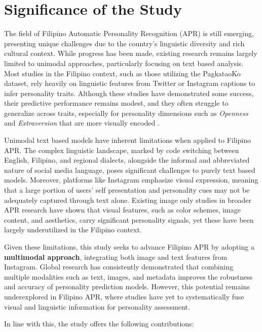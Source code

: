 
\section{Significance of the Study}
\label{sec: Significance}

The field of Filipino Automatic Personality Recognition (APR) is still emerging, presenting unique challenges due to the country’s linguistic diversity and rich cultural context. While progress has been made, existing research remains largely limited to unimodal approaches, particularly focusing on text based analysis. Most studies in the Filipino context, such as those utilizing the PagkataoKo dataset, rely heavily on linguistic features from Twitter or Instagram captions to infer personality traits. Although these studies have demonstrated some success, their predictive performance remains modest, and they often struggle to generalize across traits, especially for personality dimensions such as \textit{Openness} and \textit{Extraversion} that are more visually encoded \citep{tighe_modeling_2018}.

Unimodal text based models have inherent limitations when applied to Filipino APR. The complex linguistic landscape, marked by code switching between English, Filipino, and regional dialects, alongside the informal and abbreviated nature of social media language, poses significant challenges to purely text based models. Moreover, platforms like Instagram emphasize visual expression, meaning that a large portion of users' self presentation and personality cues may not be adequately captured through text alone. Existing image only studies in broader APR research have shown that visual features, such as color schemes, image content, and aesthetics, carry significant personality signals, yet these have been largely underutilized in the Filipino context.

Given these limitations, this study seeks to advance Filipino APR by adopting a \textbf{multimodal approach}, integrating both image and text features from Instagram. Global research has consistently demonstrated that combining multiple modalities such as text, images, and metadata improves the robustness and accuracy of personality prediction models. However, this potential remains underexplored in Filipino APR, where studies have yet to systematically fuse visual and linguistic information for personality assessment.

In line with this, the study offers the following contributions:

